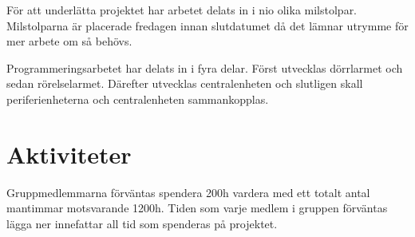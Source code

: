 \documentclass[a4paper]{article}
\begin{document}
För att underlätta projektet har arbetet delats in i nio olika milstolpar. Milstolparna är placerade fredagen innan slutdatumet då det lämnar utrymme för mer arbete om så behövs.

Programmeringsarbetet har delats in i fyra delar. Först utvecklas dörrlarmet och sedan rörelselarmet. Därefter utvecklas centralenheten och slutligen skall periferienheterna och centralenheten sammankopplas.

\section{Aktiviteter}

Gruppmedlemmarna förväntas spendera 200h vardera med ett totalt antal mantimmar motsvarande 1200h. Tiden som varje medlem i gruppen förväntas lägga ner innefattar all tid som spenderas på projektet.
\end{document}
